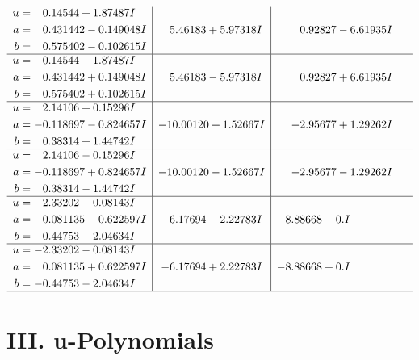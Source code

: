 \documentclass[1p]{elsarticle_modified}
\theoremstyle{definition}
\begin{document}
$$\begin{array}{c|c|c}
\begin{aligned}
u &= \phantom{-}0.14544 + 1.87487 I \\
a &= \phantom{-}0.431442 - 0.149048 I \\
b &= \phantom{-}0.575402 - 0.102615 I\end{aligned}
 & \phantom{-}5.46183 + 5.97318 I & \phantom{-}0.92827 - 6.61935 I \\ \hline\begin{aligned}
u &= \phantom{-}0.14544 - 1.87487 I \\
a &= \phantom{-}0.431442 + 0.149048 I \\
b &= \phantom{-}0.575402 + 0.102615 I\end{aligned}
 & \phantom{-}5.46183 - 5.97318 I & \phantom{-}0.92827 + 6.61935 I \\ \hline\begin{aligned}
u &= \phantom{-}2.14106 + 0.15296 I \\
a &= -0.118697 - 0.824657 I \\
b &= \phantom{-}0.38314 + 1.44742 I\end{aligned}
 & -10.00120 + 1.52667 I & -2.95677 + 1.29262 I \\ \hline\begin{aligned}
u &= \phantom{-}2.14106 - 0.15296 I \\
a &= -0.118697 + 0.824657 I \\
b &= \phantom{-}0.38314 - 1.44742 I\end{aligned}
 & -10.00120 - 1.52667 I & -2.95677 - 1.29262 I \\ \hline\begin{aligned}
u &= -2.33202 + 0.08143 I \\
a &= \phantom{-}0.081135 - 0.622597 I \\
b &= -0.44753 + 2.04634 I\end{aligned}
 & -6.17694 - 2.22783 I & -8.88668 + 0. I\phantom{ +0.000000I} \\ \hline\begin{aligned}
u &= -2.33202 - 0.08143 I \\
a &= \phantom{-}0.081135 + 0.622597 I \\
b &= -0.44753 - 2.04634 I\end{aligned}
 & -6.17694 + 2.22783 I & -8.88668 + 0. I\phantom{ +0.000000I}\\
 \hline 
 \end{array}$$\newpage
\newpage\renewcommand{\arraystretch}{1}
\centering \section*{ III. u-Polynomials}
\end{document}
